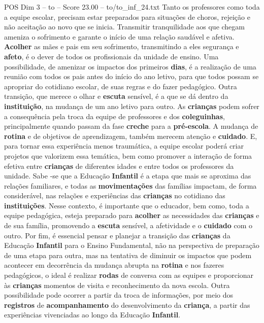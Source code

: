 \begin{textsample}{POS Dim 3 – to – Score 23.00 – to/to\_inf\_24.txt}
Tanto os professores como toda a equipe escolar, precisam estar preparados para situações de choros, rejeição e não aceitação ao novo que se inicia.
Transmitir tranquilidade aos que chegam ameniza o sofrimento e garante o início de uma relação saudável e afetiva. \textbf{Acolher} as mães e pais em seu sofrimento, transmitindo a eles segurança e \textbf{afeto}, é o dever de todos os profissionais da unidade de ensino.
Uma possibilidade, de amenizar os impactos dos primeiros \textbf{dias}, é a realização de uma reunião com todos os pais antes do início do ano letivo, para que todos possam se apropriar do cotidiano escolar, de suas regras e do fazer pedagógico.
Outra transição, que merece o olhar e \textbf{escuta} sensível, é a que se dá dentro da \textbf{instituição}, na mudança de um ano letivo para outro.
As \textbf{crianças} podem sofrer a consequência pela troca da equipe de professores e dos \textbf{coleguinhas}, principalmente quando passam da fase \textbf{creche} para a \textbf{pré-escola}.
A mudança de \textbf{rotina} e de objetivos de aprendizagem, também merecem atenção e \textbf{cuidado}.
E, para tornar essa experiência menos traumática, a equipe escolar poderá criar projetos que valorizem essa temática, bem como promover a interação de forma efetiva entre \textbf{crianças} de diferentes idades e entre todos os professores da unidade.
Sabe -se que a Educação \textbf{Infantil} é a etapa que mais se aproxima das relações familiares, e todas as \textbf{movimentações} das famílias impactam, de forma considerável, nas relações e experiências das \textbf{crianças} no cotidiano das \textbf{instituições}.
Nesse contexto, é importante que o educador, bem como, toda a equipe pedagógica, esteja preparado para \textbf{acolher} as necessidades das \textbf{crianças} e de sua família, promovendo a \textbf{escuta} sensível, a afetividade e o \textbf{cuidado} com o outro.
Por fim, é essencial pensar e planejar a transição das \textbf{crianças} da Educação \textbf{Infantil} para o Ensino Fundamental, não na perspectiva de preparação de uma etapa para outra, mas na tentativa de diminuir os impactos que podem acontecer em decorrência da mudança abrupta na \textbf{rotina} e nos fazeres pedagógicos, o ideal é realizar \textbf{rodas} de conversa com as equipes e proporcionar às \textbf{crianças} momentos de visita e reconhecimento da nova escola.
Outra possibilidade pode ocorrer a partir da troca de informações, por meio dos \textbf{registros} de \textbf{acompanhamento} do desenvolvimento da \textbf{criança}, a partir das experiências vivenciadas ao longo da Educação \textbf{Infantil}.

\end{textsample}
